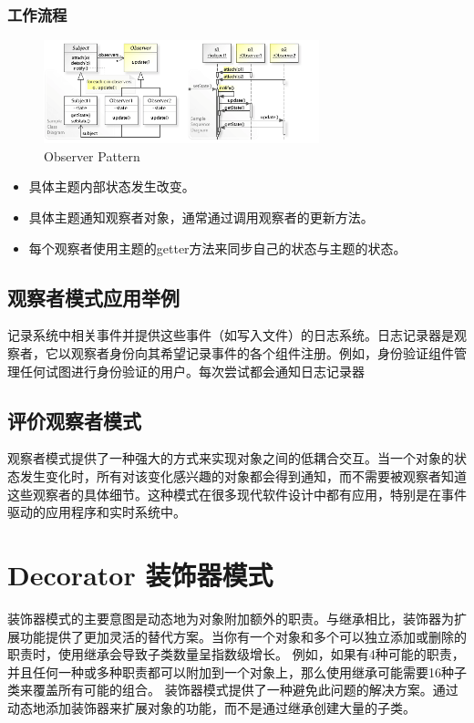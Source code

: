 \subsubsection{工作流程}

\begin{figure}[h]
    \centering
    \includegraphics[width=8cm]{res/observer_pattern.png}
    \caption{Observer Pattern}
\end{figure}

\begin{itemize}
	\item 具体主题内部状态发生改变。
	\item 具体主题通知观察者对象，通常通过调用观察者的更新方法。
	\item 每个观察者使用主题的getter方法来同步自己的状态与主题的状态。
\end{itemize}

\subsection{观察者模式应用举例}
记录系统中相关事件并提供这些事件（如写入文件）的日志系统。日志记录器是观察者，它以观察者身份向其希望记录事件的各个组件注册。例如，身份验证组件管理任何试图进行身份验证的用户。每次尝试都会通知日志记录器

\subsection{评价观察者模式}

观察者模式提供了一种强大的方式来实现对象之间的低耦合交互。当一个对象的状态发生变化时，所有对该变化感兴趣的对象都会得到通知，而不需要被观察者知道这些观察者的具体细节。这种模式在很多现代软件设计中都有应用，特别是在事件驱动的应用程序和实时系统中。

\section{Decorator 装饰器模式}

装饰器模式的主要意图是动态地为对象附加额外的职责。与继承相比，装饰器为扩展功能提供了更加灵活的替代方案。当你有一个对象和多个可以独立添加或删除的职责时，使用继承会导致子类数量呈指数级增长。
例如，如果有4种可能的职责，并且任何一种或多种职责都可以附加到一个对象上，那么使用继承可能需要16种子类来覆盖所有可能的组合。
装饰器模式提供了一种避免此问题的解决方案。通过动态地添加装饰器来扩展对象的功能，而不是通过继承创建大量的子类。

